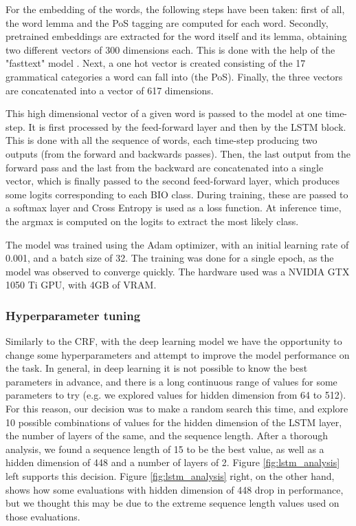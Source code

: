 \documentclass{article}
\begin{document}
For the embedding of the words, the following steps have been taken: first of all, the word lemma and the PoS
tagging are computed for each word. Secondly, pretrained embeddings are extracted for the word itself and its
lemma, obtaining two different vectors of 300 dimensions each. This is done with the help of the "fasttext" model
\cite{joulin2016bag} \cite{joulin2016fasttext}. Next, a one hot vector is created consisting of the 17 grammatical
categories a word can fall into (the PoS). Finally, the three vectors are concatenated into a vector of 617 dimensions.

This high dimensional vector of a given word is passed to the model at one time-step. It is first processed by
the feed-forward layer and then by the LSTM block. This is done with all the sequence of words, each time-step
producing two outputs (from the forward and backwards passes). Then, the last output from the forward pass and
the last from the backward are concatenated into a single vector, which is finally passed to the second
feed-forward layer, which produces some logits corresponding to each BIO class. During training, these are passed
to a softmax layer and Cross Entropy is used as a loss function. At inference time, the argmax is computed on the
logits to extract the most likely class.

The model was trained using the Adam optimizer, with an initial learning rate of 0.001, and a batch size of 32.
The training was done for a single epoch, as the model was observed to converge quickly. The hardware used was a
NVIDIA GTX 1050 Ti GPU, with 4GB of VRAM.

\subsubsection*{Hyperparameter tuning}
Similarly to the CRF, with the deep learning model we have the opportunity to change some hyperparameters and attempt
to improve the model performance on the task. In general, in deep learning it is not possible to know the best
parameters in advance, and there is a long continuous range of values for some parameters to try (e.g. we explored
values for hidden dimension from 64 to 512). For this reason, our decision was to make a random search this time,
and explore 10 possible combinations of values for the hidden dimension of the LSTM layer, the number of layers of
the same, and the sequence length. After a thorough analysis, we found a sequence length of 15 to be the best value,
as well as a hidden dimension of 448 and a number of layers of 2. Figure \ref{fig:lstm_analysis} left supports this decision.
Figure \ref{fig:lstm_analysis} right, on the other hand, shows how some evaluations with hidden dimension of 448 drop in
performance, but we thought this may be due to the extreme sequence length values used on those evaluations.
\end{document}
